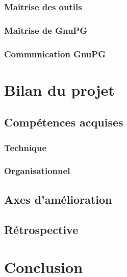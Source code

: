 \documentclass{../res/univ-projet}
\begin{document}
    \subsubsection{Maîtrise des outils}
    \subsubsection{Maîtrise de GnuPG}
    \subsubsection{Communication GnuPG}
  

\section{Bilan du projet}
  \subsection{Compétences acquises}
    \subsubsection{Technique}
    \subsubsection{Organisationnel}
  \subsection{Axes d'amélioration}
  \subsection{Rétrospective}

\section{Conclusion}
\end{document}
